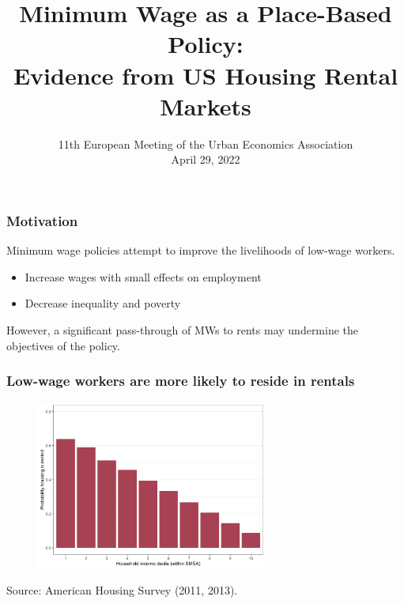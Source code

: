 \documentclass[aspectratio=169, t]{beamer}
\title{Minimum Wage as a Place-Based Policy: \\ 
       Evidence from US Housing Rental Markets}
\date{11th European Meeting of the Urban Economics Association \\ 
      \vspace{1mm} April 29, 2022}
\author{\textbf{Santiago Hermo}\inst{1} \and Diego Gentile Passaro\inst{1} \and \and Gabriele Borg\inst{2}}
\institute{\inst{1} Brown University $\quad$ \inst{2} AWS}
\begin{document}
\maketitle



\begin{frame}
    \frametitle{Motivation}
    
    Minimum wage policies attempt to improve the livelihoods of low-wage workers.
    \begin{itemize}
        \item Increase wages with small effects on employment
        {\small \color{gray} \parencite[e.g.,][]{CegnizEtAl2019}}
        \item Decrease inequality {\small \color{gray} \parencite{AutorEtAl2016}}
        and poverty {\small \color{gray} \parencite{Dube2019Income}}
    \end{itemize}
    
    \vspace{1mm}
    However, %
    a significant pass-through of MWs to rents may undermine the objectives of the policy.

\end{frame}

\begin{frame}
    \frametitle{Low-wage workers are more likely to reside in rentals}
    
    \begin{figure}
        \includegraphics[width = 0.68\textwidth]{../../input/share_renters.png}
    \end{figure}

    \footnotesize
    Source: American Housing Survey (2011, 2013).
\end{frame}
\end{document}
